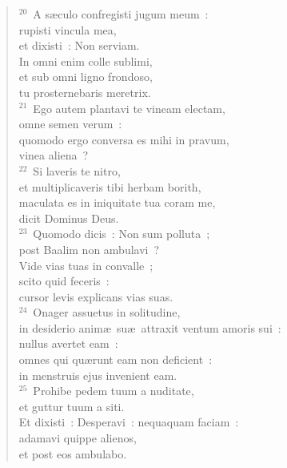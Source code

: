 \begin{verse}
${}^{20}$~A s\ae culo confregisti jugum meum~:\\ rupisti vincula mea,\\ et dixisti~: Non serviam.\\ In omni enim colle sublimi,\\ et sub omni ligno frondoso,\\ tu prosternebaris meretrix.\\
${}^{21}$~Ego autem plantavi te vineam electam,\\ omne semen verum~:\\ quomodo ergo conversa es mihi in pravum,\\ vinea aliena~?\\
${}^{22}$~Si laveris te nitro,\\ et multiplicaveris tibi herbam borith,\\ maculata es in iniquitate tua coram me,\\ dicit Dominus Deus.\\
${}^{23}$~Quomodo dicis~: Non sum polluta~;\\ post Baalim non ambulavi~?\\ Vide vias tuas in convalle~;\\ scito quid feceris~:\\ cursor levis explicans vias suas.\\
${}^{24}$~Onager assuetus in solitudine,\\ in desiderio anim\ae\ su\ae\ attraxit ventum amoris sui~:\\ nullus avertet eam~:\\ omnes qui qu\ae runt eam non deficient~:\\ in menstruis ejus invenient eam.\\
${}^{25}$~Prohibe pedem tuum a nuditate,\\ et guttur tuum a siti.\\ Et dixisti~: Desperavi~: nequaquam faciam~:\\ adamavi quippe alienos,\\ et post eos ambulabo.\end{verse}


